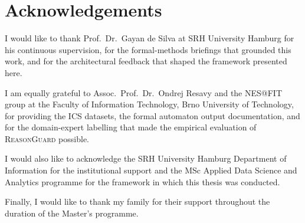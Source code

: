 \chapter*{Acknowledgements}

I would like to thank Prof.\ Dr.\ Gayan de Silva at SRH University Hamburg for his
continuous supervision, for the formal-methods briefings that grounded this work, and
for the architectural feedback that shaped the framework presented here.

I am equally grateful to Assoc.\ Prof.\ Dr.\ Ondrej Resavy and the NES@FIT group at the
Faculty of Information Technology, Brno University of Technology, for providing the
ICS datasets, the formal automaton output documentation, and for the domain-expert
labelling that made the empirical evaluation of \textsc{ReasonGuard} possible.

I would also like to acknowledge the SRH University Hamburg Department of Information
for the institutional support and the MSc Applied Data Science and Analytics programme
for the framework in which this thesis was conducted.

Finally, I would like to thank my family for their support throughout the duration of
the Master's programme.
